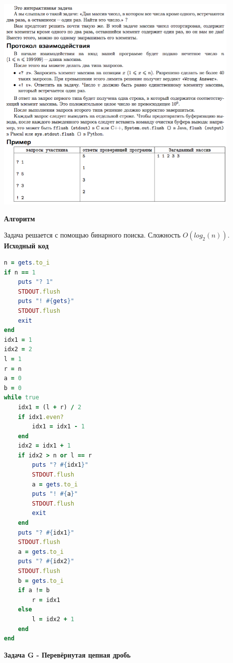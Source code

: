 \documentclass[a4paper,12pt]{article}
\begin{document}
\begin{center}
\includegraphics[width=0.9\textwidth]{OC_Baltics/E.png}\\ [1cm]
\end{center}

\textbf{{\large Алгоритм}}

Задача решается с помощью бинарного поиска. Сложность $O(log_2(n))$. \\
\newpage
\textbf{{\large Исходный код}} \\
\begin{lstlisting}[language=Ruby]
n = gets.to_i
if n == 1
    puts "? 1"
    STDOUT.flush
    puts "! #{gets}"
    STDOUT.flush
    exit
end
idx1 = 1
idx2 = 2
l = 1
r = n
a = 0
b = 0
while true
    idx1 = (l + r) / 2
    if idx1.even?
        idx1 = idx1 - 1
    end
    idx2 = idx1 + 1
    if idx2 > n or l == r
        puts "? #{idx1}"
        STDOUT.flush
        a = gets.to_i
        puts "! #{a}"
        STDOUT.flush
        exit
    end
    puts "? #{idx1}"
    STDOUT.flush
    a = gets.to_i
    puts "? #{idx2}"
    STDOUT.flush
    b = gets.to_i
    if a != b
        r = idx1
    else
        l = idx2 + 1
    end
end
\end{lstlisting}


\newpage
\textbf{{\large Задача G - Перевёрнутая цепная дробь}}
\end{document}

